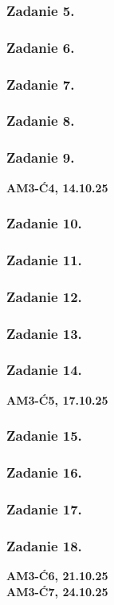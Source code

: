 \documentclass[10pt,a4paper]{article}
\newcommand{\zagadnienie}[3]{%
    \clearpage %
    \noindent\textbf{#1} #2\\
    #3
}
\begin{document}
{
    \subsubsection*{Zadanie 5.}
    \subsubsection*{Zadanie 6.}
    \subsubsection*{Zadanie 7.}
    \subsubsection*{Zadanie 8.}
    \subsubsection*{Zadanie 9.}
}
\zagadnienie{AM3-Ć4, 14.10.25}{}
{
    \subsubsection*{Zadanie 10.}
    \subsubsection*{Zadanie 11.}
    \subsubsection*{Zadanie 12.}
    \subsubsection*{Zadanie 13.}
    \subsubsection*{Zadanie 14.}
}
\zagadnienie{AM3-Ć5, 17.10.25}{}
{
    \subsubsection*{Zadanie 15.}
    \subsubsection*{Zadanie 16.}
    \subsubsection*{Zadanie 17.}
    \subsubsection*{Zadanie 18.}
}
\zagadnienie{AM3-Ć6, 21.10.25}{}
{
}
\zagadnienie{AM3-Ć7, 24.10.25}{}
{

}
\end{document}
